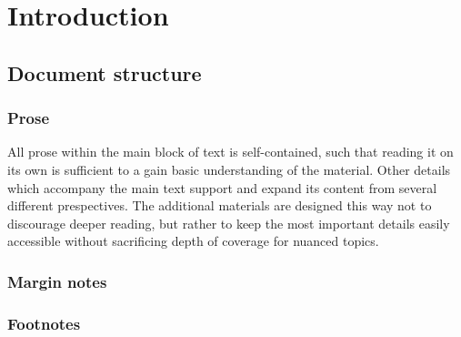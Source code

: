 \chapter{Introduction}
\section{Document structure}
\subsection{Prose}
All prose within the main block of text is self-contained, such that reading it on its own is sufficient to a gain basic understanding of the material.
Other details which accompany the main text support and expand its content from several different prespectives.
The additional materials are designed this way not to discourage deeper reading, but rather to keep the most important details easily accessible without sacrificing depth of coverage for nuanced topics.

\subsection{Margin notes}
\subsection{Footnotes}